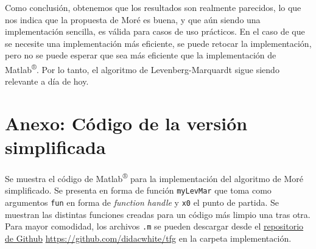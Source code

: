 \documentclass[11pt,a4paper]{book}
\theoremstyle{definition}
\theoremstyle{remark}
\def\code#1{\texttt{#1}}
\begin{document}
Como conclusión, obtenemos que los resultados son realmente parecidos, lo que nos indica que la propuesta de Moré es buena, y que aún siendo una implementación sencilla, es válida para casos de uso prácticos. En el caso de que se necesite una implementación más eficiente, se puede retocar la implementación, pero no se puede esperar que sea más eficiente que la implementación de Matlab\textsuperscript{®}.
Por lo tanto, el algoritmo de Levenberg-Marquardt sigue siendo relevante a día de hoy.




\appendix
\renewcommand{\thechapter}{\Roman{chapter}}
\chapter{Anexo: Código de la versión simplificada}\label{chap:impl-simpl}
Se muestra el código de Matlab\textsuperscript{®} para la implementación del algoritmo de Moré simplificado. Se presenta en forma de función \code{myLevMar} que toma como argumentos \code{fun} en forma de \textit{function handle} y \code{x0} el punto de partida. Se muestran las distintas funciones creadas para un código más limpio una tras otra. Para mayor comodidad, los archivos \code{.m} se pueden descargar desde el \href{https://github.com/didacwhite/tfg}{repositorio de Github} \url{https://github.com/didacwhite/tfg} en la carpeta implementación.
\vspace{10pt}













\backmatter


%




\end{document}

